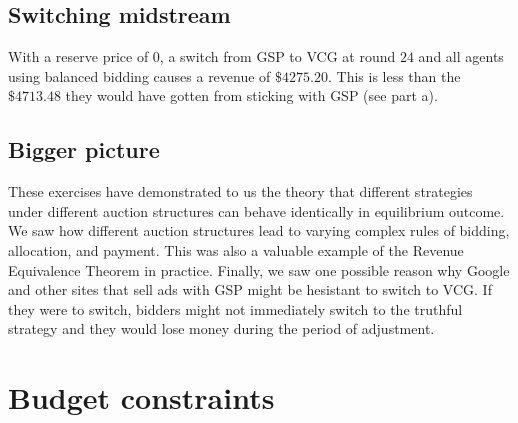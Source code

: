 \documentclass[11pt]{article}
\begin{document}
\subsection{Switching midstream}
With a reserve price of $0$, a switch from GSP to VCG at round $24$ and all agents using balanced bidding causes a revenue of $\$4275.20$. This is less than the $\$4713.48$ they would have gotten from sticking with GSP (see part a).
\subsection{Bigger picture}
These exercises have demonstrated to us the theory that different strategies under different auction structures can behave identically in equilibrium outcome. We saw how different auction structures lead to varying complex rules of bidding, allocation, and payment. This was also a valuable example of the Revenue Equivalence Theorem in practice. Finally, we saw one possible reason why Google and other sites that sell ads with GSP might be hesistant to switch to VCG. If they were to switch, bidders might not immediately switch to the truthful strategy and they would lose money during the period of adjustment.   


\section{Budget constraints}
\end{document}
